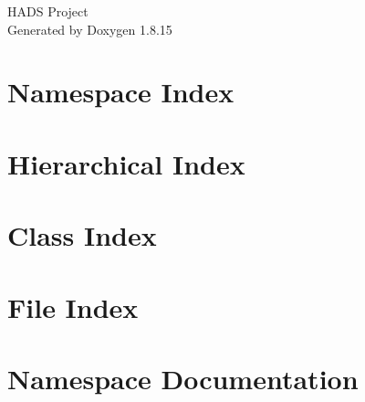 \let\mypdfximage\pdfximage\def\pdfximage{\immediate\mypdfximage}\documentclass[twoside]{book}
\newcommand{\+}{\discretionary{\mbox{\scriptsize$\hookleftarrow$}}{}{}}
\newcommand{\clearemptydoublepage}{%
  \newpage{\pagestyle{empty}\cleardoublepage}%
}
\begin{document}
\hypersetup{pageanchor=false,
             bookmarksnumbered=true,
             pdfencoding=unicode
            }
\begin{titlepage}
\vspace*{7cm}
\begin{center}%
{\Large H\+A\+DS Project }\\
\vspace*{1cm}
{\large Generated by Doxygen 1.8.15}\\
\end{center}
\end{titlepage}
\clearemptydoublepage
{}
\tableofcontents
\clearemptydoublepage
{}
\hypersetup{pageanchor=true}

\chapter{Namespace Index}

\chapter{Hierarchical Index}

\chapter{Class Index}

\chapter{File Index}

\chapter{Namespace Documentation}








\end{document}
